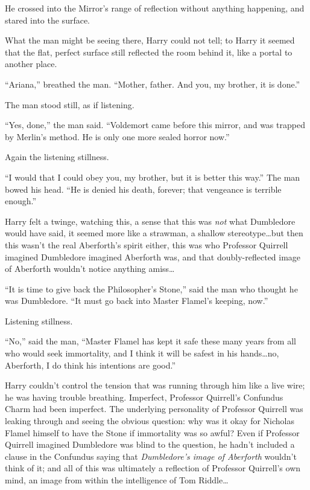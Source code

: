 He crossed into the Mirror’s range of reflection without anything happening,
and stared into the surface.

What the man might be seeing there, Harry could not tell; to Harry it seemed
that the flat, perfect surface still reflected the room behind it, like a
portal to another place.

“Ariana,” breathed the man. “Mother, father. And you, my brother, it is done.”

The man stood still, as if listening.

“Yes, done,” the man said. “Voldemort came before this mirror, and was trapped
by Merlin’s method. He is only one more sealed horror now.”

Again the listening stillness.

“I would that I could obey you, my brother, but it is better this way.” The man
bowed his head. “He is denied his death, forever; that vengeance is terrible
enough.”

Harry felt a twinge, watching this, a sense that this was \emph{not} what
Dumbledore would have said, it seemed more like a strawman, a shallow
stereotype…but then this wasn’t the real Aberforth’s spirit either,
this was who Professor Quirrell imagined Dumbledore imagined Aberforth was, and
that doubly-reflected image of Aberforth wouldn’t notice anything amiss…

“It is time to give back the Philosopher’s Stone,” said the man who thought he
was Dumbledore. “It must go back into Master Flamel’s keeping, now.”

Listening stillness.

“No,” said the man, “Master Flamel has kept it safe these many years from all
who would seek immortality, and I think it will be safest in his hands…no,
Aberforth, I do think his intentions are good.”

Harry couldn’t control the tension that was running through him like a live
wire; he was having trouble breathing. Imperfect, Professor Quirrell’s
Confundus Charm had been imperfect. The underlying personality of Professor
Quirrell was leaking through and seeing the obvious question: why was it okay
for Nicholas Flamel himself to have the Stone if immortality was so awful? Even
if Professor Quirrell imagined Dumbledore was blind to the question,
he hadn’t included a clause in the Confundus saying that
\emph{Dumbledore’s image of Aberforth} wouldn’t think of it; and all of this
was ultimately a reflection of Professor Quirrell’s own mind, an image from
within the intelligence of Tom Riddle…

